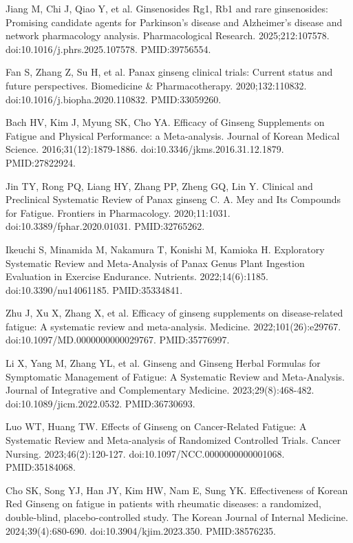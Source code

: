\documentclass[12pt,oneside]{book}
\newcommand{\reff}[2]{\par\hangindent=7mm\hangafter=1\noindent[#1]\hspace{2mm}#2\par}
\begin{document}
\reff{34}{Jiang M, Chi J, Qiao Y, et al. Ginsenosides Rg1, Rb1 and rare ginsenosides: Promising candidate agents for Parkinson's disease and Alzheimer's disease and network pharmacology analysis. Pharmacological Research. 2025;212:107578. doi:10.1016/j.phrs.2025.107578. PMID:39756554.}

\reff{35}{Fan S, Zhang Z, Su H, et al. Panax ginseng clinical trials: Current status and future perspectives. Biomedicine \& Pharmacotherapy. 2020;132:110832. doi:10.1016/j.biopha.2020.110832. PMID:33059260.}

\reff{36}{Bach HV, Kim J, Myung SK, Cho YA. Efficacy of Ginseng Supplements on Fatigue and Physical Performance: a Meta-analysis. Journal of Korean Medical Science. 2016;31(12):1879-1886. doi:10.3346/jkms.2016.31.12.1879. PMID:27822924.}

\reff{37}{Jin TY, Rong PQ, Liang HY, Zhang PP, Zheng GQ, Lin Y. Clinical and Preclinical Systematic Review of Panax ginseng C. A. Mey and Its Compounds for Fatigue. Frontiers in Pharmacology. 2020;11:1031. doi:10.3389/fphar.2020.01031. PMID:32765262.}

\reff{38}{Ikeuchi S, Minamida M, Nakamura T, Konishi M, Kamioka H. Exploratory Systematic Review and Meta-Analysis of Panax Genus Plant Ingestion Evaluation in Exercise Endurance. Nutrients. 2022;14(6):1185. doi:10.3390/nu14061185. PMID:35334841.}

\reff{39}{Zhu J, Xu X, Zhang X, et al. Efficacy of ginseng supplements on disease-related fatigue: A systematic review and meta-analysis. Medicine. 2022;101(26):e29767. doi:10.1097/MD.0000000000029767. PMID:35776997.}

\reff{40}{Li X, Yang M, Zhang YL, et al. Ginseng and Ginseng Herbal Formulas for Symptomatic Management of Fatigue: A Systematic Review and Meta-Analysis. Journal of Integrative and Complementary Medicine. 2023;29(8):468-482. doi:10.1089/jicm.2022.0532. PMID:36730693.}

\reff{41}{Luo WT, Huang TW. Effects of Ginseng on Cancer-Related Fatigue: A Systematic Review and Meta-analysis of Randomized Controlled Trials. Cancer Nursing. 2023;46(2):120-127. doi:10.1097/NCC.0000000000001068. PMID:35184068.}

\reff{42}{Cho SK, Song YJ, Han JY, Kim HW, Nam E, Sung YK. Effectiveness of Korean Red Ginseng on fatigue in patients with rheumatic diseases: a randomized, double-blind, placebo-controlled study. The Korean Journal of Internal Medicine. 2024;39(4):680-690. doi:10.3904/kjim.2023.350. PMID:38576235.}
\end{document}
